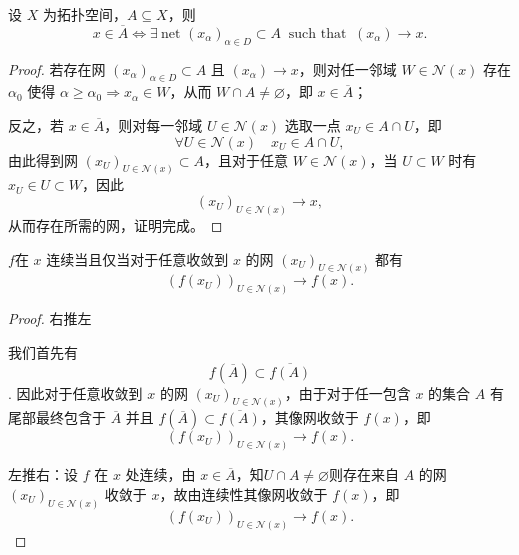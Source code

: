 \documentclass[lang=cn,a4paper,newtx,figureplace=section,tableplace=section]{elegantbook}
\begin{document}
\begin{proposition}\label{prop:closure-net}设 $X$ 为拓扑空间，$A\subseteq X$，则
\begin{equation}
x\in\overline{A}\iff \exists\ \text{net }(x_\alpha)_{\alpha\in D}\subset A\ \text{ such that }\ (x_\alpha)\to x.
\end{equation}
\end{proposition}
\begin{proof}

     若存在网 $(x_\alpha)_{\alpha\in D}\subset A$ 且 $(x_\alpha)\to x$，则对任一邻域 $W\in\mathcal{N}(x)$ 存在 $\alpha_0$ 使得 $\alpha\ge\alpha_0\Rightarrow x_\alpha\in W$，从而 $W\cap A\neq\varnothing$，即 $x\in\overline{A}$；
     
     反之，若 $x\in\overline{A}$，则对每一邻域 $U\in\mathcal{N}(x)$ 选取一点 $x_U\in A\cap U$，即
\begin{equation}
\forall U\in\mathcal{N}(x)\quad x_U\in A\cap U,
\end{equation}
由此得到网 $(x_U)_{U\in\mathcal{N}(x)}\subset A$，且对于任意 $W\in\mathcal{N}(x)$，当 $U\subset W$ 时有 $x_U\in U\subset W$，因此
\begin{equation}
(x_U)_{U\in\mathcal{N}(x)}\to x,
\end{equation}
从而存在所需的网，证明完成。
\end{proof}

\begin{proposition}
    $f $在 $x$ 连续当且仅当对于任意收敛到 $x$ 的网 $(x_U)_{U\in\mathcal{N}(x)}$ 都有
\begin{equation}
(f(x_U))_{U\in\mathcal{N}(x)}\to f(x).
\end{equation}
\end{proposition}
\begin{proof}
右推左 

我们首先有\begin{equation}
f(\overline{A})\subset\overline{f(A)}
\end{equation}. 因此对于任意收敛到 $x$ 的网 $(x_U)_{U\in\mathcal{N}(x)}$，由于对于任一包含 $x$ 的集合 $A$ 有尾部最终包含于 $\overline{A}$ 并且 $f(\overline{A})\subset\overline{f(A)}$，其像网收敛于 $f(x)$，即
\begin{equation}
(f(x_U))_{U\in\mathcal{N}(x)}\to f(x).
\end{equation}

 左推右：设 $f$ 在 $x$ 处连续，由 $x\in\overline{A}$，知$U\cap A\neq\varnothing$则存在来自 $A$ 的网 $(x_U)_{U\in\mathcal{N}(x)}$ 收敛于 $x$，故由连续性其像网收敛于 $f(x)$，即
\begin{equation}
(f(x_U))_{U\in\mathcal{N}(x)}\to f(x).
\end{equation}

\end{proof}
\end{document}
